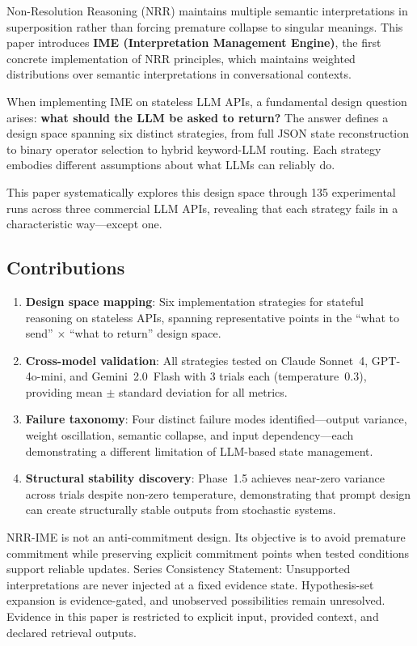 \documentclass[11pt,a4paper]{article}
\begin{document}
Non-Resolution Reasoning (NRR) \cite{saito2025nrr,saito2026phi} maintains multiple semantic
interpretations in superposition rather than forcing premature collapse to singular meanings.
This paper introduces \textbf{IME (Interpretation Management Engine)}, the first concrete
implementation of NRR principles, which maintains weighted distributions over semantic
interpretations in conversational contexts.

When implementing IME on stateless LLM APIs, a fundamental design question arises:
\textbf{what should the LLM be asked to return?} The answer defines a design space
spanning six distinct strategies, from full JSON state reconstruction to binary operator
selection to hybrid keyword-LLM routing. Each strategy embodies different assumptions
about what LLMs can reliably do.

This paper systematically explores this design space through 135 experimental runs
across three commercial LLM APIs, revealing that each strategy fails in a characteristic
way---except one.

\subsection{Contributions}

\begin{enumerate}
    \item \textbf{Design space mapping}: Six implementation strategies for stateful
    reasoning on stateless APIs, spanning representative points in the ``what to send'' $\times$
    ``what to return'' design space.
    \item \textbf{Cross-model validation}: All strategies tested on Claude Sonnet~4,
    GPT-4o-mini, and Gemini~2.0~Flash with 3 trials each (temperature~0.3), providing
    mean $\pm$ standard deviation for all metrics.
    \item \textbf{Failure taxonomy}: Four distinct failure modes identified---output
    variance, weight oscillation, semantic collapse, and input dependency---each
    demonstrating a different limitation of LLM-based state management.
    \item \textbf{Structural stability discovery}: Phase~1.5 achieves near-zero variance
    across trials despite non-zero temperature, demonstrating that prompt design can
    create structurally stable outputs from stochastic systems.
\end{enumerate}

NRR-IME is not an anti-commitment design. Its objective is to avoid premature commitment while preserving explicit commitment points when tested conditions support reliable updates.
Series Consistency Statement: Unsupported interpretations are never injected at a fixed evidence state. Hypothesis-set expansion is evidence-gated, and unobserved possibilities remain unresolved. Evidence in this paper is restricted to explicit input, provided context, and declared retrieval outputs.
\end{document}
